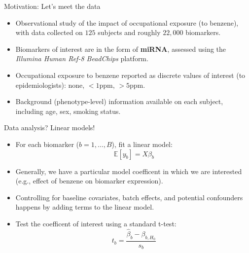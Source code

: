 \documentclass[12pt,t,handout]{beamer}
\begin{document}
\begin{frame}[c]{Motivation: Let's meet the data}
\begin{center}
\begin{itemize}
  \itemsep12pt
  \item Observational study of the impact of occupational exposure (to benzene),
    with data collected on $125$ subjects and roughly $22,000$ biomarkers.
  \item Biomarkers of interest are in the form of \textbf{miRNA}, assessed
    using the \textit{Illumina Human Ref-8 BeadChips} platform.
  \item Occupational exposure to benzene reported as discrete values of
    interest (to epidemiologists): none, $<1$ppm, $>5$ppm.
  \item Background (phenotype-level) information available on each subject,
    including age, sex, smoking status.
\end{itemize}
\end{center}


\end{frame}



\begin{frame}[c]{Data analysis? Linear models!}
\begin{center}
\begin{itemize}
  \itemsep12pt
  \item For each biomarker ($b = 1, \dots, B$), fit a linear model:
    \[
    \mathbb{E}[y_b] = X \beta_b
    \]
  \item Generally, we have a particular model coefficent in which we are
    interested (e.g., effect of benzene on biomarker expression).
  \item Controlling for baseline covariates, batch effects, and potential
    confounders happens by adding terms to the linear model.
  \item Test the coefficent of interest using a standard t-test:
    \[
      t_{b} = \frac{\hat{\beta}_{b} - \beta_{b, H_0}}{s_b}
    \]
\end{itemize}
\end{center}


\end{frame}
\end{document}
